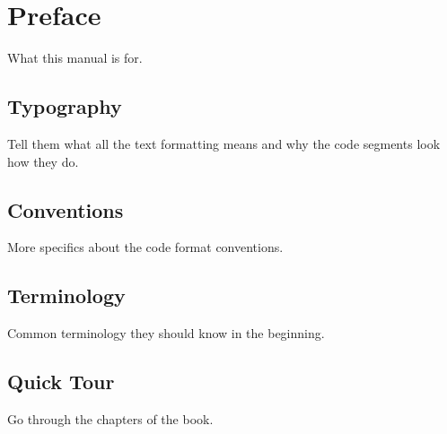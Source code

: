 \chapter*{Preface}

What this manual is for.

\section*{Typography}

Tell them what all the text formatting means and why the code segments look how they do.

\section*{Conventions}

More specifics about the code format conventions.

\section*{Terminology}

Common terminology they should know in the beginning.

\section*{Quick Tour}

Go through the chapters of the book.
